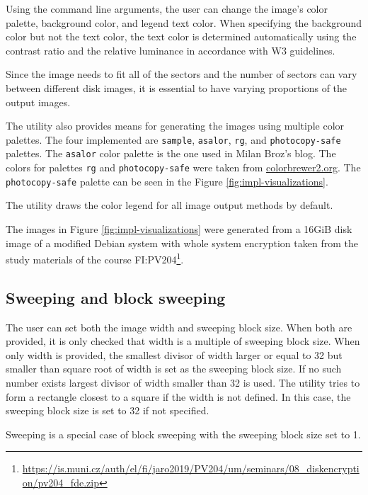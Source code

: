 \documentclass[
  digital, %
  color,   %
  oneside, %
  lof,     %
  nolot,     %
]{fithesis4}
\begin{document}
Using the command line arguments, the user can change the image's color palette, background color, and legend text color.
When specifying the background color but not the text color, the text color is determined automatically using the contrast ratio and the relative luminance in accordance with W3 guidelines.\cite{w3guidelines}

Since the image needs to fit all of the sectors and the number of sectors can vary between different disk images, it is essential to have varying proportions of the output images.

The utility also provides means for generating the images using multiple color palettes.
The four implemented are \texttt{sample}, \texttt{asalor}, \texttt{rg}, and \texttt{photocopy-safe} palettes.
The \texttt{asalor} color palette is the one used in Milan Broz's blog.\cite{broz11}
The colors for palettes \texttt{rg} and \texttt{photocopy-safe} were taken from \href{https://colorbrewer2.org/}{colorbrewer2.org}.\cite{brewer02}
The \texttt{photocopy-safe} palette can be seen in the Figure \ref{fig:impl-visualizations}.

The utility draws the color legend for all image output methods by default.

The images in Figure \ref{fig:impl-visualizations} were generated from a 16GiB disk image of a modified Debian system with whole system encryption taken from the study materials of the course FI:PV204\footnote{\url{https://is.muni.cz/auth/el/fi/jaro2019/PV204/um/seminars/08_diskencryption/pv204_fde.zip}}.

\subsection{Sweeping and block sweeping}
\label{ssec:sweeping-and-block-sweeping}

The user can set both the image width and sweeping block size.
When both are provided, it is only checked that width is a multiple of sweeping block size.
When only width is provided, the smallest divisor of width larger or equal to 32 but smaller than square root of width is set as the sweeping block size.
If no such number exists largest divisor of width smaller than 32 is used.
The utility tries to form a rectangle closest to a square if the width is not defined.
In this case, the sweeping block size is set to 32 if not specified.

Sweeping is a special case of block sweeping with the sweeping block size set to 1.
\end{document}
